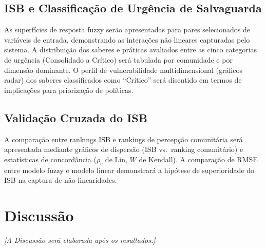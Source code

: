 \subsection{ISB e Classificação de Urgência de Salvaguarda}

As superfícies de resposta fuzzy serão apresentadas para pares selecionados de variáveis de entrada, demonstrando as interações não lineares capturadas pelo sistema. A distribuição dos saberes e práticas avaliados entre as cinco categorias de urgência (Consolidado a Crítico) será tabulada por comunidade e por dimensão dominante. O perfil de vulnerabilidade multidimensional (gráficos radar) dos saberes classificados como ``Crítico'' será discutido em termos de implicações para priorização de políticas.

\subsection{Validação Cruzada do ISB}

A comparação entre rankings ISB e rankings de percepção comunitária será apresentada mediante gráficos de dispersão (ISB vs.\ ranking comunitário) e estatísticas de concordância ($\rho_c$ de Lin, $W$ de Kendall). A comparação de RMSE entre modelo fuzzy e modelo linear demonstrará a hipótese de superioridade do ISB na captura de não linearidades.


\section{Discussão}

\textit{[A Discussão será elaborada após os resultados.]}

%


